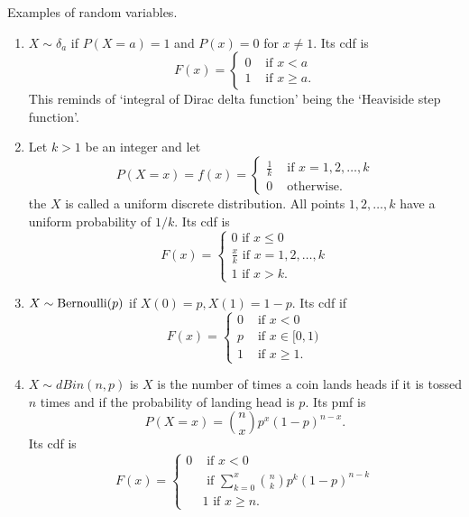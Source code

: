 \documentclass{article}
\begin{document}
Examples of random variables.
\begin{enumerate}
\item $X \sim \delta_a$ if $P(X=a) = 1$ and $P(x) = 0$ for $x \ne 1$. Its cdf is
\begin{equation}\label{c2e1}
F(x) = \begin{cases}
0 & \text{ if } x < a \\
1 & \text{ if } x \ge a.
\end{cases}
\end{equation}
This  reminds of `integral of Dirac delta function' being the `Heaviside step
function'.

\item Let $k > 1$ be an integer and let 
\begin{equation}\label{c2e2}
P(X=x) = f(x) = \begin{cases}
\frac{1}{k} & \text{ if } x = 1, 2, \ldots, k \\
0 & \text{ otherwise.}
\end{cases}
\end{equation}
the $X$ is called a uniform discrete distribution. All points $1, 2, \ldots, k$
have a uniform probability of $1/k$. Its cdf is
\begin{equation}
F(x) = \begin{cases}
0 \text{ if } x \le 0 \\
\frac{x}{k} \text{ if } x = 1, 2, \ldots, k \\
1 \text{ if } x > k.
\end{cases}
\end{equation}

\item $X \sim \text{Bernoulli}(p)$ if $X(0) = p, X(1) = 1 - p$. Its cdf if
\begin{equation}\label{c2e3}
F(x) = \begin{cases}
0 & \text{ if } x < 0 \\
p & \text{ if } x \in [0, 1) \\
1 & \text{ if } x \ge 1.
\end{cases}
\end{equation}

\item $X \sim dBin(n, p)$ is $X$ is the number of times a coin lands heads if
it is tossed $n$ times and if the probability of landing head is $p$. Its pmf
is 
\begin{equation}\label{c2e4}
P(X=x) = \binom{n}{x}p^x(1 - p)^{n-x}.
\end{equation}
Its cdf is
\begin{equation}\label{c2e5}
F(x) = \begin{cases}
0 & \text{ if } x < 0 \\
 & \text{ if } \sum_{k=0}^x\binom{n}{k}p^k(1 - p)^{n-k} \\
 & 1 \text{ if } x \ge n.
\end{cases}
\end{equation}


\end{enumerate}
\end{document}
